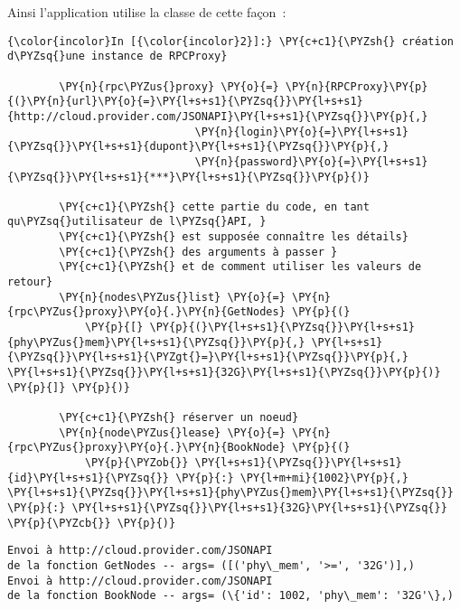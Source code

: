     Ainsi l'application utilise la classe de cette façon~:

    \begin{Verbatim}[commandchars=\\\{\},frame=single,framerule=0.3mm,rulecolor=\color{cellframecolor}]
{\color{incolor}In [{\color{incolor}2}]:} \PY{c+c1}{\PYZsh{} création d\PYZsq{}une instance de RPCProxy}
        
        \PY{n}{rpc\PYZus{}proxy} \PY{o}{=} \PY{n}{RPCProxy}\PY{p}{(}\PY{n}{url}\PY{o}{=}\PY{l+s+s1}{\PYZsq{}}\PY{l+s+s1}{http://cloud.provider.com/JSONAPI}\PY{l+s+s1}{\PYZsq{}}\PY{p}{,} 
                             \PY{n}{login}\PY{o}{=}\PY{l+s+s1}{\PYZsq{}}\PY{l+s+s1}{dupont}\PY{l+s+s1}{\PYZsq{}}\PY{p}{,}
                             \PY{n}{password}\PY{o}{=}\PY{l+s+s1}{\PYZsq{}}\PY{l+s+s1}{***}\PY{l+s+s1}{\PYZsq{}}\PY{p}{)}
        
        \PY{c+c1}{\PYZsh{} cette partie du code, en tant qu\PYZsq{}utilisateur de l\PYZsq{}API, }
        \PY{c+c1}{\PYZsh{} est supposée connaître les détails}
        \PY{c+c1}{\PYZsh{} des arguments à passer }
        \PY{c+c1}{\PYZsh{} et de comment utiliser les valeurs de retour}
        \PY{n}{nodes\PYZus{}list} \PY{o}{=} \PY{n}{rpc\PYZus{}proxy}\PY{o}{.}\PY{n}{GetNodes} \PY{p}{(} 
            \PY{p}{[} \PY{p}{(}\PY{l+s+s1}{\PYZsq{}}\PY{l+s+s1}{phy\PYZus{}mem}\PY{l+s+s1}{\PYZsq{}}\PY{p}{,} \PY{l+s+s1}{\PYZsq{}}\PY{l+s+s1}{\PYZgt{}=}\PY{l+s+s1}{\PYZsq{}}\PY{p}{,} \PY{l+s+s1}{\PYZsq{}}\PY{l+s+s1}{32G}\PY{l+s+s1}{\PYZsq{}}\PY{p}{)} \PY{p}{]} \PY{p}{)}
        
        \PY{c+c1}{\PYZsh{} réserver un noeud}
        \PY{n}{node\PYZus{}lease} \PY{o}{=} \PY{n}{rpc\PYZus{}proxy}\PY{o}{.}\PY{n}{BookNode} \PY{p}{(}
            \PY{p}{\PYZob{}} \PY{l+s+s1}{\PYZsq{}}\PY{l+s+s1}{id}\PY{l+s+s1}{\PYZsq{}} \PY{p}{:} \PY{l+m+mi}{1002}\PY{p}{,} \PY{l+s+s1}{\PYZsq{}}\PY{l+s+s1}{phy\PYZus{}mem}\PY{l+s+s1}{\PYZsq{}} \PY{p}{:} \PY{l+s+s1}{\PYZsq{}}\PY{l+s+s1}{32G}\PY{l+s+s1}{\PYZsq{}} \PY{p}{\PYZcb{}} \PY{p}{)}
\end{Verbatim}


    \begin{Verbatim}[commandchars=\\\{\},frame=single,framerule=0.3mm,rulecolor=\color{cellframecolor}]
Envoi à http://cloud.provider.com/JSONAPI
de la fonction GetNodes -- args= ([('phy\_mem', '>=', '32G')],)
Envoi à http://cloud.provider.com/JSONAPI
de la fonction BookNode -- args= (\{'id': 1002, 'phy\_mem': '32G'\},)
\end{Verbatim}

